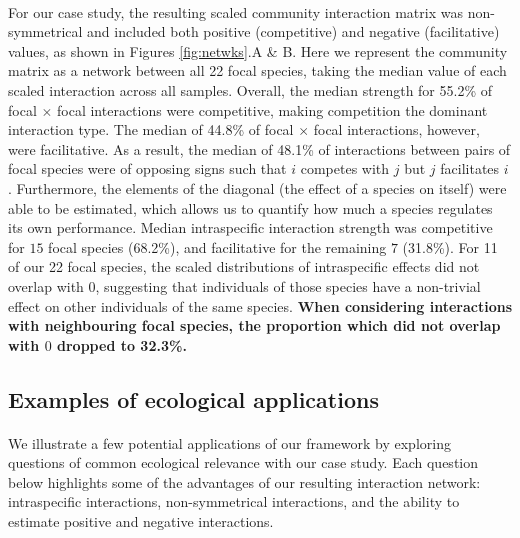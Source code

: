 \documentclass[a4,12pt]{article}
\begin{document}
\begin{refsection}
    \paragraph{}
    For our case study, the resulting scaled community interaction matrix was non-symmetrical and included both positive (competitive) and negative (facilitative) values, as shown in Figures \ref{fig:netwks}.A \& B. Here we represent the community matrix as a network between all 22 focal species, taking the median value of each scaled interaction across all samples. Overall, the median strength for 55.2\% of focal $\times$ focal interactions were competitive, making competition the dominant interaction type. The median of 44.8\% of focal $\times$ focal interactions, however, were facilitative. As a result, the median of 48.1\% of interactions between pairs of focal species were of opposing signs such that $i$ competes with $j$ but $j$ facilitates $i$. Furthermore, the elements of the diagonal (the effect of a species on itself) were able to be estimated, which allows us to quantify how much a species regulates its own performance. Median intraspecific interaction strength was competitive for $15$ focal species (68.2\%), and facilitative for the remaining $7$ (31.8\%). For 11 of our 22 focal species, the scaled distributions of intraspecific effects did not overlap with $0$, suggesting that individuals of those species have a non-trivial effect on other individuals of the same species. \textbf{When considering interactions with neighbouring focal species, the proportion which did not overlap with $0$ dropped to 32.3\%.}

    \subsection{Examples of ecological applications}

    \paragraph{}
    We illustrate a few potential applications of our framework by exploring questions of common ecological relevance with our case study. Each question below highlights some of the advantages of our resulting interaction network: intraspecific interactions, non-symmetrical interactions, and the ability to estimate positive and negative interactions. 


\end{refsection}
\end{document}
